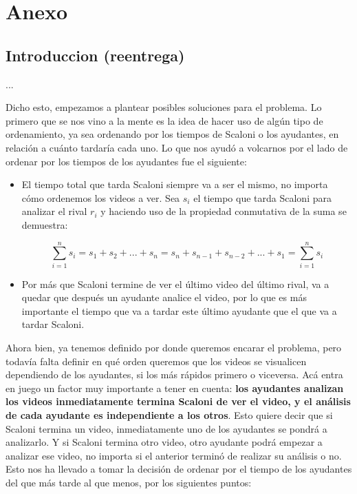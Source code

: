 \section{Anexo}

\subsection{Introduccion (reentrega)}

...

Dicho esto, empezamos a plantear posibles soluciones para el problema. Lo primero que se nos vino a la mente es la idea de hacer uso de algún tipo de ordenamiento, ya sea ordenando por los tiempos de Scaloni o los ayudantes, en relación a cuánto tardaría cada uno. Lo que nos ayudó a volcarnos por el lado de ordenar por los tiempos de los ayudantes fue el siguiente:

\begin{itemize}
    \item El tiempo total que tarda Scaloni siempre va a ser el mismo, no importa cómo ordenemos los videos a ver. Sea $s_i$ el tiempo que tarda Scaloni para analizar el rival $r_i$ y haciendo uso de la propiedad conmutativa de la suma se demuestra:
    	\begin{center}
        	\[ \sum_{i=1}^{n} s_i = s_1 + s_2 + ... + s_n = s_n + s_{n-1} + s_{n-2} + ... + s_1 = \sum_{i=1}^{n} s_i \]
    	\end{center}
    
    \item Por más que Scaloni termine de ver el último video del último rival, va a quedar que después un ayudante analice el video, por lo que es más importante el tiempo que va a tardar este último ayudante que el que va a tardar Scaloni.
\end{itemize}

Ahora bien, ya tenemos definido por donde queremos encarar el problema, pero todavía falta definir en qué orden queremos que los videos se visualicen dependiendo de los ayudantes, si los más rápidos primero o viceversa. Acá entra en juego un factor muy importante a tener en cuenta: \textbf{los ayudantes analizan los videos inmediatamente termina Scaloni de ver el video, y el análisis de cada ayudante es independiente a los otros}. Esto quiere decir que si Scaloni termina un video, inmediatamente uno de los ayudantes se pondrá a analizarlo. Y si Scaloni termina otro video, otro ayudante podrá empezar a analizar ese video, no importa si el anterior terminó de realizar su análisis o no. Esto nos ha llevado a tomar la decisión de ordenar por el tiempo de los ayudantes del que más tarde al que menos, por los siguientes puntos:

